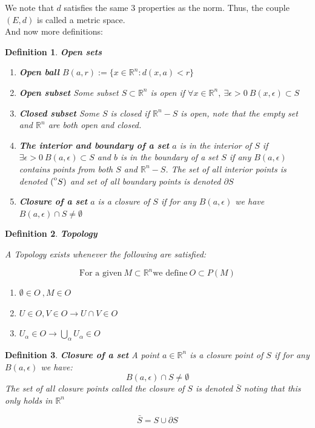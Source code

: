 \documentclass[titlepage]{article}
\newtheorem{definition}{Definition}
\newcommand{\interior}[1]{%
  {\kern0pt#1}^{\mathrm{o}}%
}
\newcommand{\Rn}{\mathbb{R}^n}
\begin{document}
We note that $d$ satisfies the same 3 properties as the norm. Thus, the couple \textbf{$(E,d)$} is called a metric space. 
\\

And now more definitions:

\begin{definition} \textbf{Open sets}
\begin{enumerate}
    \\
    
    \item \textbf{Open ball} $ B(a,r) := \{x \in \Rn : d(x,a) < r\}$
    \item \textbf{Open subset} Some subset $S \subset \Rn$ is open if $\forall x \in \Rn, \ \exists \epsilon > 0 \ B(x,\epsilon) \subset S$
    \item \textbf{Closed subset} Some $S$ is closed if $\Rn - S$ is open, note that the empty set and $\Rn$ are both open and closed. 
    \item \textbf{The interior and boundary of a set} $a$ is in the interior of $S$ if $\exists \epsilon > 0 \ B(a,\epsilon) \subset S$ and $b$ is in the boundary of a set $S$ if any $B(a, \epsilon)$ contains points from both $S$ and $\Rn - S$. The set of all interior points is denoted $\interior(S)$ and set of all boundary points is denoted $\partial S$
    \item \textbf{Closure of a set} $a$ is a closure of $S$ if for any $B(a,\epsilon)$ we have $B(a, \epsilon) \cap S \not = \emptyset$ 
\end{enumerate}

\end{definition}

\begin{definition}\textbf{Topology}

A Topology exists whenever the following are satisfied:

$$\text{For a given} \ M \subset \Rn \text{we define} \ O \subset P(M) $$
\begin{enumerate}
    \item $\emptyset \in O \ , M \in O $
    \item $U \in O, V \in O \rightarrow U \cap V \in O$
    \item $U_{\alpha} \in O \rightarrow \bigcup_{\alpha} U_{\alpha} \in O$
\end{enumerate}

\end{definition}


\begin{definition}\textbf{Closure of a set}
A point $a \in \Rn$ is a closure point of $S$ if for any $B(a,\epsilon)$ we have:
$$B(a,\epsilon) \cap S \not = \emptyset$$
The set of all closure points called the closure of $S$ is denoted $\bar{S}$ noting that this only holds in $\Rn$

$$\bar{S} = S \cup \partial S$$
\end{definition}
\end{document}
